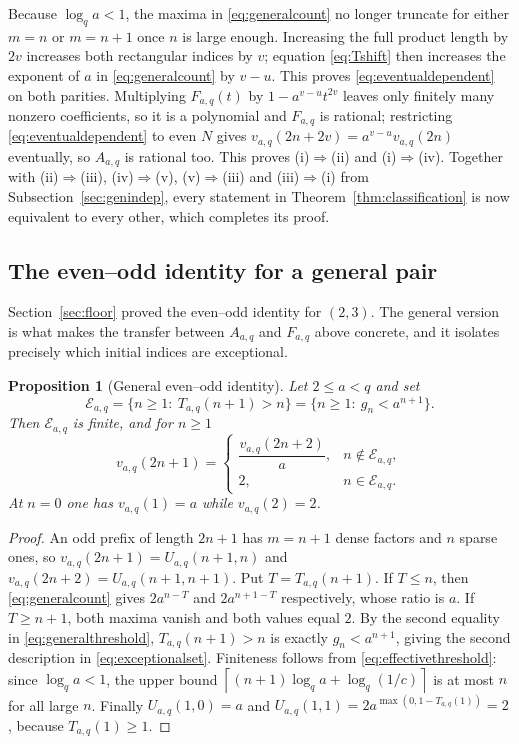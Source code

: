 \documentclass[11pt,letterpaper]{article}
\numberwithin{equation}{section}
\newtheorem{proposition}[theorem]{Proposition}
\theoremstyle{definition}
\theoremstyle{remark}
\newcommand{\ceil}[1]{\left\lceil#1\right\rceil}
\begin{document}
Because $\log_q a<1$, the maxima in \eqref{eq:generalcount} no longer
truncate for either $m=n$ or $m=n+1$ once $n$ is large enough.
Increasing the full product length by $2v$ increases both rectangular
indices by $v$; equation \eqref{eq:Tshift} then increases the exponent of
$a$ in \eqref{eq:generalcount} by $v-u$. This proves
\eqref{eq:eventualdependent} on both parities.
Multiplying $F_{a,q}(t)$ by $1-a^{v-u}t^{2v}$ leaves only
finitely many nonzero coefficients, so it is a polynomial and $F_{a,q}$ is
rational; restricting \eqref{eq:eventualdependent} to even $N$ gives
$v_{a,q}(2n+2v)=a^{v-u}v_{a,q}(2n)$ eventually, so $A_{a,q}$ is rational
too. This proves (i)$\Rightarrow$(ii) and (i)$\Rightarrow$(iv). Together
with (ii)$\Rightarrow$(iii), (iv)$\Rightarrow$(v), (v)$\Rightarrow$(iii)
and (iii)$\Rightarrow$(i) from Subsection~\ref{sec:genindep}, every
statement in Theorem~\ref{thm:classification} is now equivalent to every
other, which completes its proof.

\subsection{The even--odd identity for a general pair}\label{sec:genparity}
Section~\ref{sec:floor} proved the even--odd identity for $(2,3)$. The
general version is what makes the transfer between $A_{a,q}$ and $F_{a,q}$
above concrete, and it isolates precisely which initial indices are
exceptional.

\begin{proposition}[General even--odd identity]\label{prop:generalparity}
Let $2\le a<q$ and set
\begin{equation}\label{eq:exceptionalset}
 \mathcal E_{a,q}=\{n\ge1:\ T_{a,q}(n+1)>n\}
 =\{n\ge1:\ g_n<a^{n+1}\}.
\end{equation}
Then $\mathcal E_{a,q}$ is finite, and for $n\ge1$
\begin{equation}\label{eq:generalodd}
 v_{a,q}(2n+1)=
 \begin{cases}
  \dfrac{v_{a,q}(2n+2)}{a}, & n\notin\mathcal E_{a,q},\\[0.8em]
  2, & n\in\mathcal E_{a,q}.
 \end{cases}
\end{equation}
At $n=0$ one has $v_{a,q}(1)=a$ while $v_{a,q}(2)=2$.
\end{proposition}
\begin{proof}
An odd prefix of length $2n+1$ has $m=n+1$ dense factors and $n$ sparse
ones, so $v_{a,q}(2n+1)=U_{a,q}(n+1,n)$ and
$v_{a,q}(2n+2)=U_{a,q}(n+1,n+1)$. Put $T=T_{a,q}(n+1)$. If $T\le n$, then
\eqref{eq:generalcount} gives $2a^{n-T}$ and $2a^{n+1-T}$ respectively,
whose ratio is $a$. If $T\ge n+1$, both maxima vanish and both values
equal $2$. By the second equality in \eqref{eq:generalthreshold},
$T_{a,q}(n+1)>n$ is exactly $g_n<a^{n+1}$, giving the second description in
\eqref{eq:exceptionalset}. Finiteness follows from
\eqref{eq:effectivethreshold}: since $\log_qa<1$, the upper bound
$\ceil{(n+1)\log_qa+\log_q(1/c)}$ is at most $n$ for all large $n$.
Finally $U_{a,q}(1,0)=a$ and $U_{a,q}(1,1)=2a^{\max(0,1-T_{a,q}(1))}=2$,
because $T_{a,q}(1)\ge1$.
\end{proof}
\end{document}
